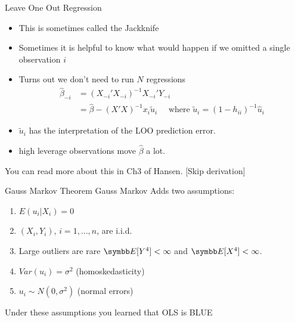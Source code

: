 \documentclass[aspectratio=169,11pt]{beamer}
\begin{document}
\begin{frame}{Leave One Out Regression}
\begin{itemize}
\item This is sometimes called the \alert{Jackknife}
\item Sometimes it is helpful to know what would happen if we omitted a single observation $i$
\item Turns out we don't need to run $N$ regressions
\begin{align*}
\widehat{\beta}_{-i} &= (X_{-i}'X_{-i})^{-1} X_{-i}' Y_{-i} \\
&=\widehat{\beta} -  (X 'X)^{-1} x_i  \tilde{u}_i  \quad \mbox{ where } \tilde{u}_i = (1-h_{ii})^{-1}\hat{u}_i
\end{align*}
\item $\tilde{u}_i $ has the interpretation of the \alert{LOO prediction error}.
\item high leverage observations move $\widehat{\beta}$ a lot.
\end{itemize}
You can read more about this in Ch3 of Hansen. [Skip derivation]
\end{frame}







\begin{frame}{Gauss Markov Theorem}
Gauss Markov Adds two assumptions:
\begin{enumerate}
\item $E(u_i |X_i ) = 0$
\item $(X_i,Y_i)$, $i =1,\ldots,n$, are i.i.d.
\item Large outliers are rare $\E[Y^4]< \infty$ and $\E[X^4]<\infty$.
\item $Var(u_i) = \sigma^2$ (homoskedasticity)
\item $u_i \sim N(0,\sigma^2)$ (normal errors)
\end{enumerate}
Under these assumptions you learned that OLS is \alert{BLUE}
\end{frame}
\end{document}

